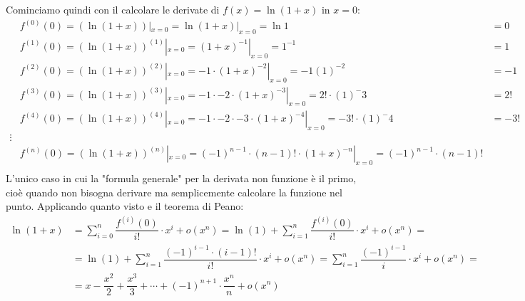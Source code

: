 Cominciamo quindi con il calcolare le derivate di $f(x) = \ln{(1 + x)}$ in $x = 0$:
\begin{align*}
	&f^{(0)}(0) = (\ln{(1+x)}) |_{x = 0} = \ln{(1 + x)} |_{x = 0} = \ln{1} &= 0\\[5pt]
	&f^{(1)}(0) = (\ln{(1+x)})^{(1)}|_{x = 0} = (1+x)^{-1} |_{x = 0} = 1^{-1} &= 1\\[5pt]
	&f^{(2)}(0) = (\ln{(1+x)})^{(2)} |_{x = 0} = -1 \cdot (1+x)^{-2} |_{x = 0} = -1(1)^{-2} &= -1\\[5pt]
	&f^{(3)}(0) = (\ln{(1+x)})^{(3)} |_{x = 0} = -1 \cdot - 2 \cdot (1+x)^{-3} |_{x = 0} = 2! \cdot (1)^-3 &= 2!\\
	&f^{(4)}(0) = (\ln{(1+x)})^{(4)} |_{x = 0} = -1 \cdot - 2 \cdot -3 \cdot (1+x)^{-4} |_{x = 0} = -3! \cdot (1)^-4 &= -3!\\
	\vdots\\
	&f^{(n)}(0) = (\ln{(1+x)})^{(n)} |_{x = 0} = (-1)^{n-1} \cdot (n-1)! \cdot (1+x)^{-n} |_{x = 0} = (-1)^{n-1} \cdot (n-1)!\\
\end{align*}
L'unico caso in cui la "formula generale" per la derivata non funzione è il primo, cioè quando non bisogna derivare ma semplicemente calcolare la funzione nel punto. Applicando quanto visto e il teorema di Peano:
\begin{align*}
	\ln{(1 + x)} &= \sum \limits_{i = 0}^n \dfrac{f^{(i)}(0)}{i!} \cdot x^i + o(x^n) = \ln(1) + \sum \limits_{i = 1}^n \dfrac{f^{(i)}(0)}{i!} \cdot x^i + o(x^n) = \\[5pt]
	&= \ln(1) + \sum \limits_{i = 1}^n \dfrac{(-1)^{i-1} \cdot (i -1)!}{i!} \cdot x^i + o(x^n) = \sum \limits_{i = 1}^n \dfrac{(-1)^{i-1}}{i} \cdot x^i + o(x^n) =\\[5pt]
	&= x - \dfrac{x^2}{2} + \dfrac{x^3}{3} + \cdots + (-1)^{n+1} \cdot \dfrac{x^n}{n} + o(x^n)
\end{align*}

